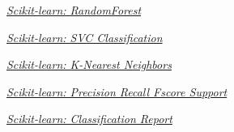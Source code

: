 \documentclass[8pt,a4paper]{{esannV2}}
\begin{document}
\begin{thebibliography}{99}


\emph{\href{https://scikit-learn.org/stable/modules/generated/sklearn.ensemble.RandomForestClassifier.html}{Scikit-learn: RandomForest}}


\emph{\href{https://scikit-learn.org/stable/modules/generated/sklearn.svm.SVC.html}{Scikit-learn: SVC Classification}}

\emph{\href{https://scikit-learn.org/stable/modules/neighbors.html}{Scikit-learn: K-Nearest Neighbors}}

\emph{\href{https://scikit-learn.org/stable/modules/neighbors.html}{Scikit-learn: Precision Recall Fscore Support}}

\emph{\href{https://scikit-learn.org/stable/modules/neighbors.html}{Scikit-learn: Classification Report}}
\end{thebibliography}
\end{document}

